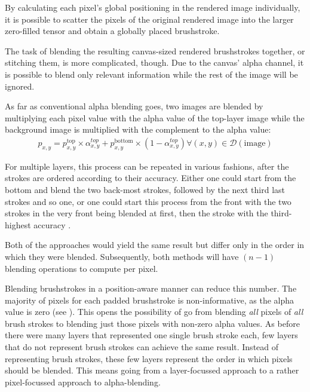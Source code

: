 By calculating each pixel's global positioning in the rendered image individually, it is possible to scatter the pixels of the original rendered image into the larger zero-filled tensor and obtain a globally placed brushstroke.

The task of blending the resulting canvas-sized rendered brushstrokes together, or stitching them, is more complicated, though.
Due to the canvas' alpha channel, it is possible to blend only relevant information while the rest of the image will be ignored.

As far as conventional alpha blending goes, two images are blended by multiplying each pixel value with the alpha value of the top-layer image while the background image is multiplied with the complement to the alpha value:
\begin{align}
    p_{x,y} = p^{\text{top}}_{x, y} \times \alpha^{top}_{x, y}
    + p^{\text{bottom}}_{x, y} \times (1 - \alpha^{top}_{x, y})
    \forall (x, y) \in \mathcal{D}(\text{image})
\end{align}

For multiple layers, this process can be repeated in various fashions, after the strokes are ordered according to their accuracy.
Either one could start from the bottom and blend the two back-most strokes, followed by the next third last strokes and so one, or one could start this process from the front with the two strokes in the very front being blended at first, then the stroke with the third-highest accuracy \etc.

Both of the approaches would yield the same result but differ only in the order in which they were blended.
Subsequently, both methods will have $(n-1)$ blending operations to compute per pixel.

Blending brushstrokes in a position-aware manner can reduce this number.
The majority of pixels for each padded brushstroke is non-informative, as the alpha value is zero (see ).
This opens the possibility of go from blending \textit{all} pixels of \textit{all} brush strokes to blending just those pixels with non-zero alpha values.
As before there were many layers that represented one single brush stroke each, few layers that do not represent brush strokes can achieve the same result.
Instead of representing brush strokes, these few layers represent the order in which pixels should be blended.
This means going from a layer-focussed approach to a rather pixel-focussed approach to alpha-blending.

